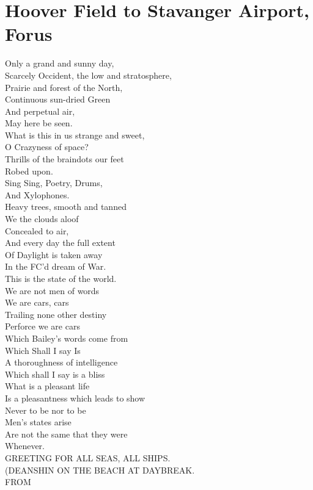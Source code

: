 \documentclass[smalldemyvopaper,11pt,twoside,onecolumn,openright,extrafontsizes]{memoir}
\begin{document}
\chapter{Hoover Field to Stavanger Airport, Forus}
Only a grand and sunny day,
\\Scarcely Occident, the low and stratosphere,
\\Prairie and forest of the North,
\\Continuous sun-dried Green
\\And perpetual air,
\\May here be seen.
\\What is this in us strange and sweet,
\\O Crazyness of space?
\\Thrills of the braindots our feet
\\Robed upon.
\\Sing Sing, Poetry, Drums,
\\And Xylophones.
\\Heavy trees, smooth and tanned
\\We the clouds aloof
\\Concealed to air,
\\And every day the full extent
\\Of Daylight is taken away
\\In the FC'd dream of War.
\\This is the state of the world.
\\We are not men of words
\\We are cars, cars
\\Trailing none other destiny
\\Perforce we are cars
\\Which Bailey's words come from
\\Which Shall I say Is
\\A thoroughness of intelligence
\\Which shall I say is a bliss
\\What is a pleasant life
\\Is a pleasantness which leads to show
\\Never to be nor to be
\\Men's states arise
\\Are not the same that they were
\\Whenever.
\\GREETING FOR ALL SEAS, ALL SHIPS.
\\(DEANSHIN ON THE BEACH AT DAYBREAK.
\\FROM
\end{document}
